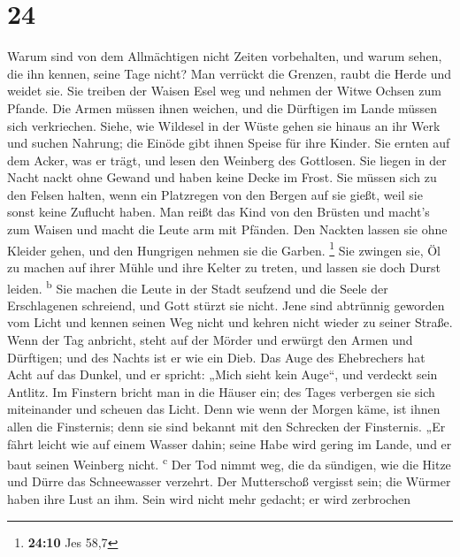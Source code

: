 \hypertarget{section-23}{%
\section{24}\label{section-23}}

 Warum sind von dem Allmächtigen nicht Zeiten vorbehalten,
und warum sehen, die ihn kennen, seine Tage nicht?  Man
verrückt die Grenzen, raubt die Herde und weidet sie.  Sie
treiben der Waisen Esel weg und nehmen der Witwe Ochsen zum Pfande.
 Die Armen müssen ihnen weichen, und die Dürftigen im
Lande müssen sich verkriechen.  Siehe, wie Wildesel in der
Wüste gehen sie hinaus an ihr Werk und suchen Nahrung; die Einöde gibt
ihnen Speise für ihre Kinder.  Sie ernten auf dem Acker,
was er trägt, und lesen den Weinberg des Gottlosen.  Sie
liegen in der Nacht nackt ohne Gewand und haben keine Decke im Frost.
 Sie müssen sich zu den Felsen halten, wenn ein Platzregen
von den Bergen auf sie gießt, weil sie sonst keine Zuflucht haben.
 Man reißt das Kind von den Brüsten und macht's zum Waisen
und macht die Leute arm mit Pfänden.  Den Nackten lassen
sie ohne Kleider gehen, und den Hungrigen nehmen sie die Garben.
\footnote{\textbf{24:10} Jes 58,7}  Sie zwingen sie, Öl
zu machen auf ihrer Mühle und ihre Kelter zu treten, und lassen sie doch
Durst leiden. \textsuperscript{b}  Sie machen die Leute
in der Stadt seufzend und die Seele der Erschlagenen schreiend, und Gott
stürzt sie nicht.  Jene sind abtrünnig geworden vom Licht
und kennen seinen Weg nicht und kehren nicht wieder zu seiner Straße.
 Wenn der Tag anbricht, steht auf der Mörder und erwürgt
den Armen und Dürftigen; und des Nachts ist er wie ein Dieb.
 Das Auge des Ehebrechers hat Acht auf das Dunkel, und er
spricht: „Mich sieht kein Auge``, und verdeckt sein Antlitz.
 Im Finstern bricht man in die Häuser ein; des Tages
verbergen sie sich miteinander und scheuen das Licht. 
Denn wie wenn der Morgen käme, ist ihnen allen die Finsternis; denn sie
sind bekannt mit den Schrecken der Finsternis.  „Er fährt
leicht wie auf einem Wasser dahin; seine Habe wird gering im Lande, und
er baut seinen Weinberg nicht. \textsuperscript{c}  Der
Tod nimmt weg, die da sündigen, wie die Hitze und Dürre das Schneewasser
verzehrt.  Der Mutterschoß vergisst sein; die Würmer
haben ihre Lust an ihm. Sein wird nicht mehr gedacht; er wird zerbrochen
